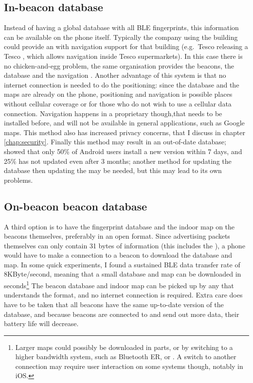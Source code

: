 \subsection{In-\app beacon database}
Instead of having a global database with all BLE fingerprints, this information can be available on the phone itself.
Typically the company using the building could provide an \app with navigation support for that building (e.g.\ Tesco releasing a Tesco \app, which allows navigation inside Tesco supermarkets).
In this case there is no chicken-and-egg problem, the same organisation provides the beacons, the database and the navigation \app.
Another advantage of this system is that no internet connection is needed to do the positioning: since the database and the maps are already on the phone, positioning and navigation is possible places without cellular coverage or for those who do not wish to use a cellular data connection.
Navigation happens in a proprietary \app though,that needs to be installed before, and will not be available in general applications, such as Google maps.
This method also has increased privacy concerns, that I discuss in chapter \ref{chap:security}.
Finally this method may result in an out-of-date database; \citet{moller2012update} showed that only 50\% of Android users install a new \app version within 7 days, and 25\% has not updated even after 3 months; another method for updating the database then updating the \app may be needed, but this may lead to its own problems.

\subsection{On-beacon beacon database}
A third option is to have the fingerprint database and the indoor map on the beacons themselves, preferably in an open format.
Since advertising packets themselves can only contain 31 bytes of information (this includes the \bid), a phone would have to make a connection to a beacon to download the database and map.
In some quick experiments, I found a sustained BLE data transfer rate of 8KByte/second, meaning that a small database and map can be downloaded in seconds\footnote{Larger maps could possibly be downloaded in parts, or by switching to a higher bandwidth system, such as Bluetooth ER, or \wifi. A switch to another connection may require user interaction on some systems though, notably in iOS.}
The beacon database and indoor map can be picked up by any \app that understands the format, and no internet connection is required.
Extra care does have to be taken that all beacons have the same up-to-date version of the database, and because beacons are connected to and send out more data, their battery life will decrease.

